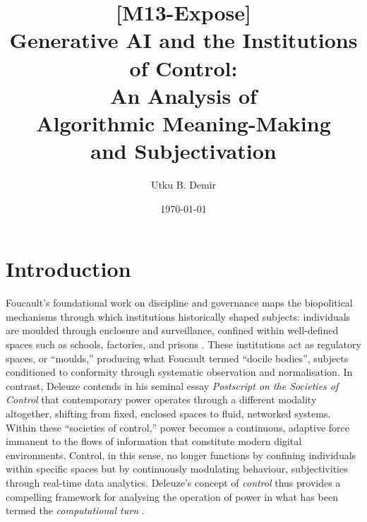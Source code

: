 
\pdfstringdefDisableCommands

\title{[M13-Expose] \\Generative AI and the Institutions of Control:\\An Analysis of\\Algorithmic Meaning-Making\\and Subjectivation}
\author{Utku B. Demir}
\date{\today}


\maketitle

\section{Introduction}


Foucault’s foundational work on discipline and governance maps the biopolitical mechanisms through which institutions historically shaped subjects: individuals are moulded through enclosure and surveillance, confined within well-defined spaces such as schools, factories, and prisons \parencite[]{foucault2008a, Foucault1995}. These institutions act as regulatory spaces, or “moulds,” producing what Foucault termed “docile bodies”, subjects conditioned to conformity through systematic observation and normalisation. In contrast, Deleuze contends in his seminal essay \textit{Postscript on the Societies of Control} \parencite[]{deleuze1995a} that contemporary power operates through a different modality altogether, shifting from fixed, enclosed spaces to fluid, networked systems. Within these “societies of control,” power becomes a continuous, adaptive force immanent to the flows of information that constitute modern digital environments. Control, in this sense, no longer functions by confining individuals within specific spaces but by continuously modulating behaviour, subjectivities through real-time data analytics. Deleuze’s concept of \textit{control} thus provides a compelling framework for analysing the operation of power in what has been termed the \textit{computational turn} .

